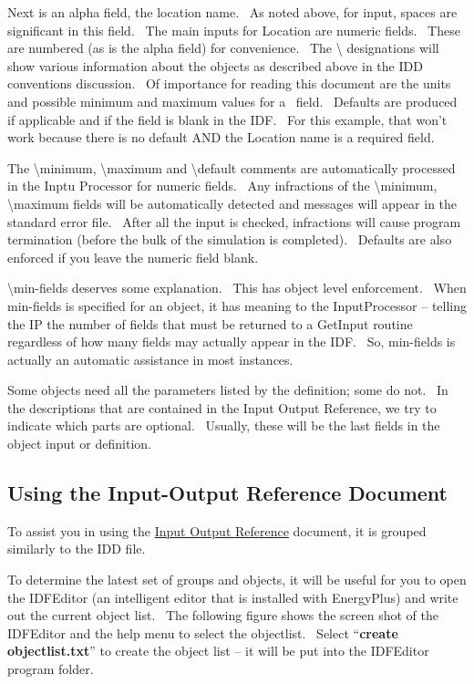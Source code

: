 Next is an alpha field, the location name.~ As noted above, for input, spaces are significant in this field.~ The main inputs for Location are numeric fields.~ These are numbered (as is the alpha field) for convenience.~ The \textbackslash{} designations will show various information about the objects as described above in the IDD conventions discussion.~ Of importance for reading this document are the units and possible minimum and maximum values for a~ field.~ Defaults are produced if applicable and if the field is blank in the IDF.~ For this example, that won't work because there is no default AND the Location name is a required field.

The \textbackslash{}minimum, \textbackslash{}maximum and \textbackslash{}default comments are automatically processed in the Inptu Processor for numeric fields.~ Any infractions of the \textbackslash{}minimum, \textbackslash{}maximum fields will be automatically detected and messages will appear in the standard error file.~ After all the input is checked, infractions will cause program termination (before the bulk of the simulation is completed).~ Defaults are also enforced if you leave the numeric field blank.

\textbackslash{}min-fields deserves some explanation.~ This has object level enforcement.~ When min-fields is specified for an object, it has meaning to the InputProcessor -- telling the IP the number of fields that must be returned to a GetInput routine regardless of how many fields may actually appear in the IDF.~ So, min-fields is actually an automatic assistance in most instances.

Some objects need all the parameters listed by the definition; some do not.~ In the descriptions that are contained in the Input Output Reference, we try to indicate which parts are optional.~ Usually, these will be the last fields in the object input or definition.

\subsection{Using the Input-Output Reference Document}\label{using-the-input-output-reference-document}

To assist you in using the \href{https://energyplus.readthedocs.io/en/latest/guides/input-output-reference/index.html}{Input Output Reference} document, it is grouped similarly to the IDD file.

To determine the latest set of groups and objects, it will be useful for you to open the IDFEditor (an intelligent editor that is installed with EnergyPlus) and write out the current object list.~ The following figure shows the screen shot of the IDFEditor and the help menu to select the objectlist.~ Select ``\textbf{create objectlist.txt}'' to create the object list -- it will be put into the IDFEditor program folder.

